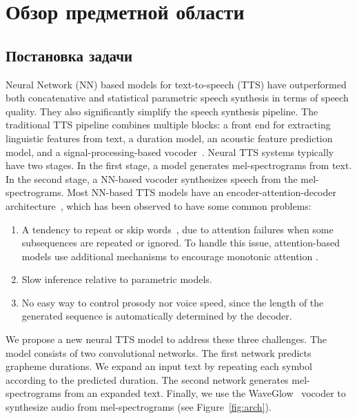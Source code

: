 \section{Обзор предметной области}

\subsection{Постановка задачи}

Neural Network (NN) based models for text-to-speech (TTS) have outperformed both concatenative and statistical parametric speech synthesis in terms of speech quality. They also significantly simplify the speech synthesis pipeline. The traditional TTS pipeline combines multiple blocks: a front end for extracting linguistic features from text, a duration model, an acoustic feature prediction model, and a signal-processing-based vocoder~\cite{taylor}. Neural TTS systems typically have two stages. In the first stage, a model generates  mel-spectrograms from text. In the second stage, a NN-based vocoder synthesizes speech from the mel-spectrograms. Most NN-based TTS models have an encoder-attention-decoder architecture~\cite{bahdanau}, which has been observed to have some common problems:
\begin{enumerate}
    \item A tendency to repeat or skip words~\cite{fastspeech}, due to attention failures when some sub\-sequences are repeated or ignored. To handle this issue, attention-based models use additional mechanisms to encourage monotonic attention \cite{tacotron2,deepvoice3,taigman2017}.
    \item Slow inference relative to parametric models.
    \item No easy way to control prosody nor voice speed, since the length of the generated sequence is automatically determined by the decoder.
\end{enumerate}

We propose a new neural TTS model to address these three challenges. The model consists of two convolutional networks. The first network predicts grapheme durations. We expand an input text by repeating each symbol according to the predicted duration. The second network generates mel-spectrograms from an expanded text. Finally, we use the WaveGlow~\cite{waveglow} vocoder to synthesize audio from mel-spectrograms (see Figure~\ref{fig:arch}).

